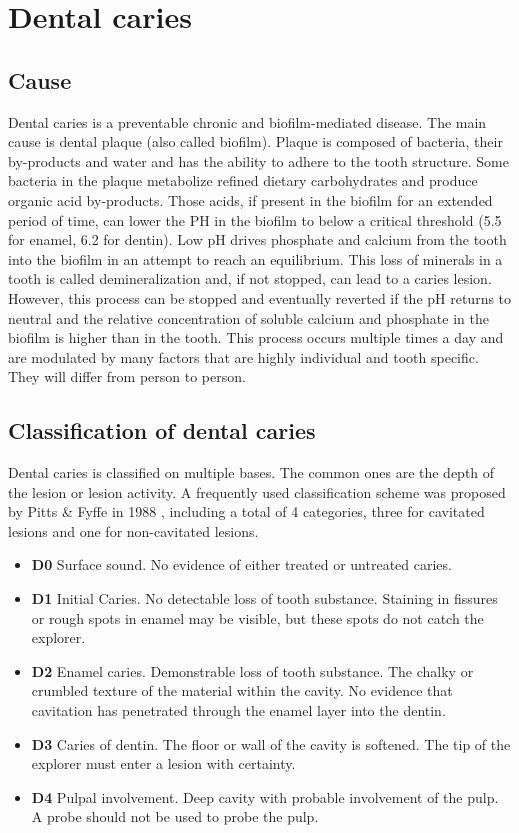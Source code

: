 \section{Dental caries}

\subsection{Cause}
Dental caries is a preventable chronic and biofilm-mediated disease. The main cause is dental plaque (also called biofilm). Plaque is composed of bacteria, their by-products and water and has the ability to adhere to the tooth structure. Some bacteria in the plaque metabolize refined dietary carbohydrates and produce organic acid by-products. Those acids, if present in the biofilm for an extended period of time, can lower the PH in the biofilm to below a critical threshold (5.5 for enamel, 6.2 for dentin)\cite{2019a}. Low pH drives phosphate and calcium from the tooth into the biofilm in an attempt to reach an equilibrium. This loss of minerals in a tooth is called demineralization and, if not stopped, can lead to a caries lesion. However, this process can be stopped and eventually reverted if the pH returns to neutral and the relative concentration of soluble calcium and phosphate in the biofilm is higher than in the tooth. This process occurs multiple times a day and are modulated by many factors that are highly individual and tooth specific. They will differ from person to person.


\subsection{Classification of dental caries}
Dental caries is classified on multiple bases. The common ones are the depth of the lesion or lesion activity. \newline
A frequently used classification scheme was proposed by Pitts \& Fyffe in 1988 \cite{2019a}, including a total of 4 categories, three for cavitated lesions and one for non-cavitated lesions.
\begin{itemize}
    \item \textbf{D0} Surface sound. No evidence of either treated or untreated caries.
    \item \textbf{D1} Initial Caries. No detectable loss of tooth substance. Staining in fissures or rough spots in enamel may be visible, but these spots do not catch the explorer.
    \item \textbf{D2} Enamel caries. Demonstrable loss of tooth substance. The chalky or crumbled texture of the material within the cavity. No evidence that cavitation has penetrated through the enamel layer into the dentin.
    \item \textbf{D3} Caries of dentin. The floor or wall of the cavity is softened. The tip of the explorer must enter a lesion with certainty.
    \item \textbf{D4} Pulpal involvement. Deep cavity with probable involvement of the pulp. A probe should not be used to probe the pulp.
\end{itemize}

